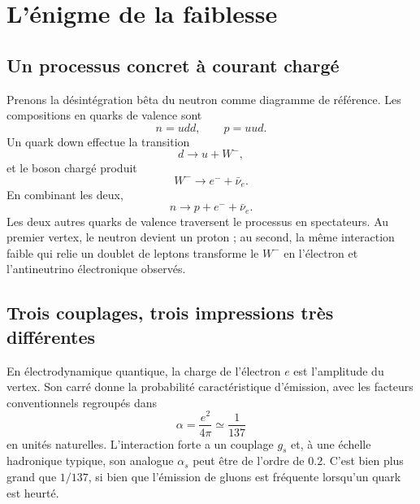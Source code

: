 \section{L’énigme de la faiblesse}

\subsection{Un processus concret à courant chargé}

Prenons la désintégration bêta du neutron comme diagramme de référence. Les compositions en quarks de valence sont
\begin{equation}
  n=udd,\qquad p=uud.
\end{equation}
Un quark down effectue la transition
\begin{equation}
  d\longrightarrow u+W^-,
\end{equation}
et le boson chargé produit
\begin{equation}
  W^-\longrightarrow e^-+\bar\nu_e.
\end{equation}
En combinant les deux,
\begin{equation}
  n\longrightarrow p+e^-+\bar\nu_e.
\end{equation}
Les deux autres quarks de valence traversent le processus en spectateurs. Au premier vertex, le neutron devient un proton ; au second, la même interaction faible qui relie un doublet de leptons transforme le \(W^-\) en l’électron et l’antineutrino électronique observés.

\subsection{Trois couplages, trois impressions très différentes}

En électrodynamique quantique, la charge de l’électron \(e\) est l’amplitude du vertex. Son carré donne la probabilité caractéristique d’émission, avec les facteurs conventionnels regroupés dans
\begin{equation}
  \alpha=\frac{e^2}{4\pi}\simeq\frac1{137}
\end{equation}
en unités naturelles. L’interaction forte a un couplage \(g_s\) et, à une échelle hadronique typique, son analogue \(\alpha_s\) peut être de l’ordre de \(0.2\).
C’est bien plus grand que \(1/137\), si bien que l’émission de gluons est fréquente lorsqu’un quark est heurté.

